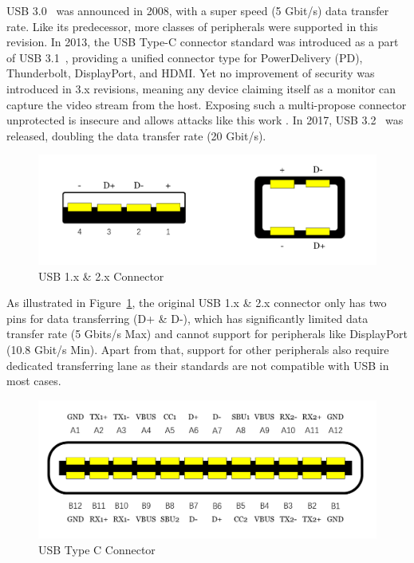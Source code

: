 USB 3.0~\cite{usb30} was announced in 2008, with a super speed (5 Gbit/s) data
transfer rate. Like its predecessor, more classes of peripherals were supported
in this revision. In 2013, the USB Type-C connector standard was introduced as a
part of USB 3.1~\cite{usb31}, providing a unified connector type for
PowerDelivery (PD), Thunderbolt, DisplayPort, and HDMI.  Yet no improvement of
security was introduced in 3.x revisions, meaning any device claiming
itself as a monitor can capture the video stream from the host. Exposing
such a multi-propose connector unprotected is insecure and allows attacks like
this work \tool. In 2017, USB 3.2~\cite{usb32} was released, doubling the data
transfer rate (20 Gbit/s).

\begin{figure}[t]
    \centering
	\includegraphics[width=0.7\linewidth]{./Figs/usb_conn.png}
	\caption{USB 1.x \& 2.x Connector}
	\label{fig:usb_conn}
\end{figure}

As illustrated in Figure~\ref{fig:usb_conn}, the original USB 1.x \& 2.x
connector only has two pins for data transferring (D+ \& D-), which has
significantly limited data transfer rate (5 Gbits/s Max) and cannot support for
peripherals like DisplayPort (10.8 Gbit/s Min). Apart from that, support for
other peripherals also require dedicated transferring lane as their standards
are not compatible with USB in most cases.  

\begin{figure}[t] 
	\centering
	\includegraphics[width=\linewidth]{./Figs/usb_c_conn.png} 
	\caption{USB Type C Connector} 
	\label{fig:usb_c_conn} 
\end{figure}

